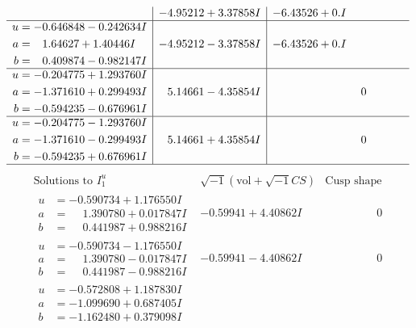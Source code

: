\documentclass[1p]{elsarticle_modified}
\theoremstyle{definition}
\newcommand{\I}{\sqrt{-1}}
\begin{document}
$$\begin{array}{c|c|c}
 & -4.95212 + 3.37858 I & -6.43526 + 0. I\phantom{ +0.000000I} \\ \hline\begin{aligned}
u &= -0.646848 - 0.242634 I \\
a &= \phantom{-}1.64627 + 1.40446 I \\
b &= \phantom{-}0.409874 - 0.982147 I\end{aligned}
 & -4.95212 - 3.37858 I & -6.43526 + 0. I\phantom{ +0.000000I} \\ \hline\begin{aligned}
u &= -0.204775 + 1.293760 I \\
a &= -1.371610 + 0.299493 I \\
b &= -0.594235 - 0.676961 I\end{aligned}
 & \phantom{-}5.14661 - 4.35854 I & \phantom{-0.000000 } 0 \\ \hline\begin{aligned}
u &= -0.204775 - 1.293760 I \\
a &= -1.371610 - 0.299493 I \\
b &= -0.594235 + 0.676961 I\end{aligned}
 & \phantom{-}5.14661 + 4.35854 I & \phantom{-0.000000 } 0\\
 \hline 
 \end{array}$$\newpage$$\begin{array}{c|c|c}  
\text{Solutions to }I^u_{1}& \I (\text{vol} + \sqrt{-1}CS) & \text{Cusp shape}\\
 \hline 
\begin{aligned}
u &= -0.590734 + 1.176550 I \\
a &= \phantom{-}1.390780 + 0.017847 I \\
b &= \phantom{-}0.441987 + 0.988216 I\end{aligned}
 & -0.59941 + 4.40862 I & \phantom{-0.000000 } 0 \\ \hline\begin{aligned}
u &= -0.590734 - 1.176550 I \\
a &= \phantom{-}1.390780 - 0.017847 I \\
b &= \phantom{-}0.441987 - 0.988216 I\end{aligned}
 & -0.59941 - 4.40862 I & \phantom{-0.000000 } 0 \\ \hline\begin{aligned}
u &= -0.572808 + 1.187830 I \\
a &= -1.099690 + 0.687405 I \\
b &= -1.162480 + 0.379098 I\end{aligned}

\end{array}$$
\end{document}
